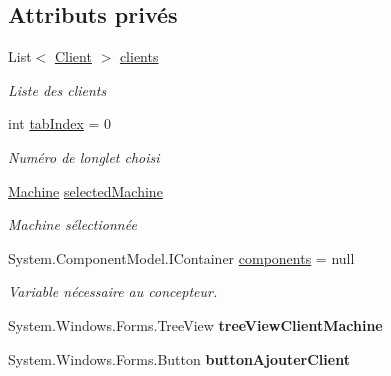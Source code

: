 \subsection*{Attributs privés}
\begin{DoxyCompactItemize}
\item 
List$<$ \mbox{\hyperlink{class_m_t_connect_agent_1_1_model_1_1_client}{Client}} $>$ \mbox{\hyperlink{class_m_t_connect_agent_1_1_form_main_a09ffacfbac9fad30a140bd11b36577a5}{clients}}
\begin{DoxyCompactList}\small\item\em Liste des clients \end{DoxyCompactList}\item 
int \mbox{\hyperlink{class_m_t_connect_agent_1_1_form_main_aa1f34402faaa02cad5c6c8028ff4e633}{tab\+Index}} = 0
\begin{DoxyCompactList}\small\item\em Numéro de l\textquotesingle{}onglet choisi \end{DoxyCompactList}\item 
\mbox{\hyperlink{class_m_t_connect_agent_1_1_model_1_1_machine}{Machine}} \mbox{\hyperlink{class_m_t_connect_agent_1_1_form_main_a0baaf0dbbac66a3914652ce754f2398b}{selected\+Machine}}
\begin{DoxyCompactList}\small\item\em Machine sélectionnée \end{DoxyCompactList}\item 
System.\+Component\+Model.\+I\+Container \mbox{\hyperlink{class_m_t_connect_agent_1_1_form_main_a5d0fbfe75eb79bdc22e0d262fdc18ff2}{components}} = null
\begin{DoxyCompactList}\small\item\em Variable nécessaire au concepteur. \end{DoxyCompactList}\item 
\mbox{\label{class_m_t_connect_agent_1_1_form_main_addc30e71091a6b662653b36b6ba182a9}} 
System.\+Windows.\+Forms.\+Tree\+View {\bfseries tree\+View\+Client\+Machine}
\item 
\mbox{\label{class_m_t_connect_agent_1_1_form_main_ab4d2bcf24db1f9edcb05988105c85ddf}} 
System.\+Windows.\+Forms.\+Button {\bfseries button\+Ajouter\+Client}
\item 
\mbox{\label{class_m_t_connect_agent_1_1_form_main_a71bcb0b19ed0dae8dce1f61723f68f12}} 

\end{DoxyCompactItemize}
